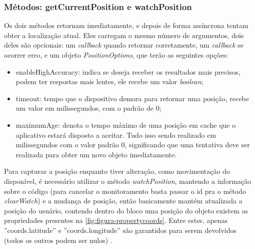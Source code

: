 \subsubsection{Métodos: getCurrentPosition e watchPosition}
Os dois métodos retornam imediatamente, e depois de forma assíncrona tentam obter a localização atual. Eles carregam o mesmo número de argumentos, dois deles são opcionais: um \textit{callback} quando retornar corretamente, um \textit{callback} se ocorrer erro, e um objeto \textit{PositionOptions}, que terão as seguintes opções:

\begin{itemize}
    \item enableHighAccuracy: indica se deseja receber os resultados mais precisos, podem ter respostas mais lentes, ele recebe um valor \textit{boolean};
    \item timeout: tempo que o dispositivo demora para retornar uma posição, recebe um valor em milissegundos, com o padrão de 0;
    \item maximumAge: denota o tempo máximo de uma posição em cache que o aplicativo estará disposto a aceitar. Tudo isso sendo realizado em milissegundos com o valor padrão 0, significando que uma tentativa deve ser realizada para obter um novo objeto imediatamente.
\end{itemize}

Para capturar a posição enquanto tiver alteração, como movimentação do disponível, é necessário utilizar o método \textit{watchPosition}, mantendo a informação sobre o código (para cancelar o monitoramento basta passar o id pra o método \textit{clearWatch}) e a mudança de posição, então basicamente mantém atualizada a posição do usuário, contendo dentro do bloco uma posição do objeto existem as propriedades presentes na \autoref{fig:figura-propertycoords}. Entre estes, apenas ''coords.latitude'' e ''coords.longitude'' são garantidos para serem devolvidos (todos os outros podem ser nulos) \cite{geolocalizacao:2011}.

